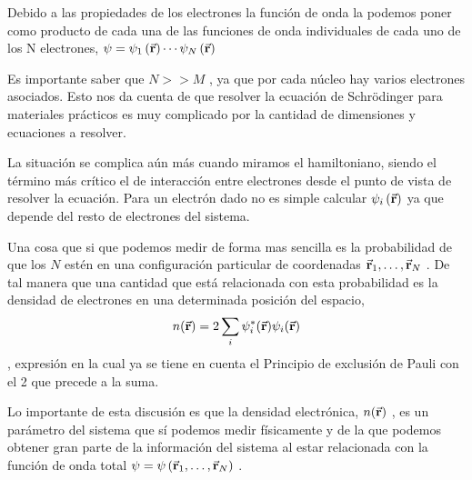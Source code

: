 Debido a las propiedades de los electrones la función de onda la podemos poner como producto de cada una de las funciones de onda individuales de cada uno de los N electrones, $\psi = \psi_{1} \left( \va{r} \right) \cdots \psi_{N} \left( \va{r} \right)$ 

Es importante saber que $N>>M$ , ya que por cada núcleo hay varios electrones asociados. Esto nos da cuenta de que resolver la ecuación de Schrödinger para materiales prácticos es muy complicado por la cantidad de dimensiones y ecuaciones a resolver. 

La situación se complica aún más cuando miramos el hamiltoniano, siendo el término más crítico el de interacción entre electrones desde el punto de vista de resolver la ecuación. Para un electrón dado no es simple calcular $\psi_{i} \left( \va{r} \right)$ ya que depende del resto de electrones del sistema.

Una cosa que si que podemos medir de forma mas sencilla es la probabilidad de que los $N$ estén en una configuración particular de coordenadas $\va{r}_{1} , \dots , \va{r}_{N}$ . De tal manera que una cantidad que está relacionada con esta probabilidad es la densidad de electrones en una determinada posición del espacio, $$ n(\va{r}) = 2 \sum_i \psi^*_i (\va{r}) \psi_i (\va{r}) $$ , expresión en la cual ya se tiene en cuenta el Principio de exclusión de Pauli con el 2 que precede a la suma.

Lo importante de esta discusión es que la densidad electrónica, $n(\va{r})$ , es un parámetro del sistema que sí podemos medir físicamente y de la que podemos obtener gran parte de la información del sistema al estar relacionada con la función de onda total  $\psi = \psi \left( \va{r}_{1} , \dots , \va{r}_{N} \right)$ .